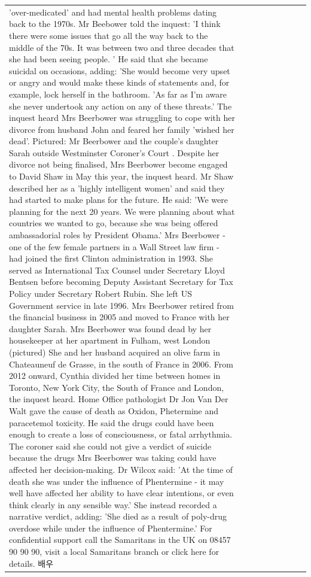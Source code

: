 \begin{table}[H]
\begin{tabular}{lllrlllll}
'over-medicated' and had mental health problems dating back to the 1970s. Mr Beebower told the inquest: 'I think there were some issues that go all the way back to the middle of the 70s. It was between two and three decades that she had been seeing people. ' He said that she became suicidal on occasions, adding: 'She would become very upset or angry and would make these kinds of statements and, for example, lock herself in the bathroom. 'As far as I'm aware she never undertook any action on any of these threats.' The inquest heard Mrs Beerbower was struggling to cope with her divorce from husband John and feared her family 'wished her dead'. Pictured: Mr Beerbower and the couple's daughter Sarah outside Westminster Coroner's Court . Despite her divorce not being finalised, Mrs Beerbower become engaged to David Shaw in May this year, the inquest heard. Mr Shaw described her as a 'highly intelligent women' and said they had started to make plans for the future. He said: 'We were planning for the next 20 years. We were planning about what countries we wanted to go, because she was being offered ambassadorial roles by President Obama.' Mrs Beerbower - one of the few female partners in a Wall Street law firm - had joined the first Clinton administration in 1993. She served as International Tax Counsel under Secretary Lloyd Bentsen before becoming Deputy Assistant Secretary for Tax Policy under Secretary Robert Rubin. She left US Government service in late 1996. Mrs Beerbower retired from the financial business in 2005 and moved to France with her daughter Sarah. Mrs Beerbower was found dead by her housekeeper at her apartment in Fulham, west London (pictured) She and her husband acquired an olive farm in Chateauneuf de Grasse, in the south of France in 2006. From 2012 onward, Cynthia divided her time between homes in Toronto, New York City, the South of France and London, the inquest heard. Home Office pathologist Dr Jon Van Der Walt gave the cause of death as Oxidon, Phetermine and paracetemol toxicity. He said the drugs could have been enough to create a loss of consciousness, or fatal arrhythmia. The coroner said she could not give a verdict of suicide because the drugs Mrs Beerbower was taking could have affected her decision-making. Dr Wilcox said: 'At the time of death she was under the influence of Phentermine - it may well have affected her ability to have clear intentions, or even think clearly in any sensible way.' She instead recorded a narrative verdict, adding: 'She died as a result of poly-drug overdose while under the influence of Phentermine.' For confidential support call the Samaritans in the UK on 08457 90 90 90, visit a local Samaritans branch or click here for details. 배우 \\

\end{tabular}
\end{table}
